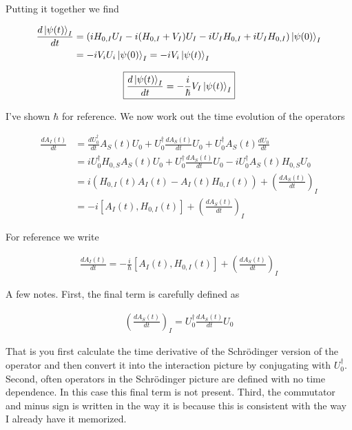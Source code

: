 \documentclass[12pt]{article}
\begin{document}
Putting it together we find

\begin{align}
\frac{d \ket{\psi(t)}_I}{d t} &= \left(i H_{0,I} U_I - i (H_{0,I} + V_I) U_I - i U_I H_{0,I} + i U_I H_{0,I} \right)\ket{\psi(0)}_I\\
&=-iV_iU_i\ket{\psi(0)}_I = -iV_i\ket{\psi(t)}_I
\end{align}

\begin{align}
\boxed{\frac{d \ket{\psi(t)}_I}{d t} = -\frac{i}{\hbar} V_I \ket{\psi(t)}_I}
\end{align}

I've shown $\hbar$ for reference.
We now work out the time evolution of the operators

\begin{align}
\frac{d A_I(t)}{d t} &= \frac{d U_0^{\dag}}{d t} A_S(t) U_0 + U_0^{\dag} \frac{d A_S(t)}{d t} U_0 + U_0^{\dag} A_S(t) \frac{d U_0}{d t}\\
&= i U_0^{\dag}H_{0,S} A_S(t)U_0 + U_0^{\dag} \frac{d A_S(t)}{d t} U_0 - i U_0^{\dag}A_S(t)H_{0,S} U_0\\
&= i\left(H_{0,I}(t)A_I(t) - A_I(t)H_{0,I}(t)\right) + \left(\frac{d A_S(t)}{d t} \right)_I\\
&= -i\left[A_I(t), H_{0,I}(t)\right] + \left(\frac{d A_S(t)}{d t}\right)_I
\end{align}

For reference we write

\begin{align}
\boxed{\frac{d A_I(t)}{d t} = -\frac{i}{\hbar} \left[A_I(t), H_{0,I}(t)\right] + \left(\frac{d A_S(t)}{d t} \right)_I}
\end{align}

A few notes. First, the final term is carefully defined as

\begin{align}
\left(\frac{d A_S(t)}{d t} \right)_I = U_0^{\dag} \frac{d A_S(t)}{d t} U_0 
\end{align}

That is you first calculate the time derivative of the Schr{\"o}dinger version of the operator and then convert it into the interaction picture by conjugating with $U_0^{\dag}$. Second, often operators in the Schr{\"o}dinger picture are defined with no time dependence. In this case this final term is not present. Third, the commutator and minus sign is written in the way it is because this is consistent with the way I already have it memorized.
\end{document}

